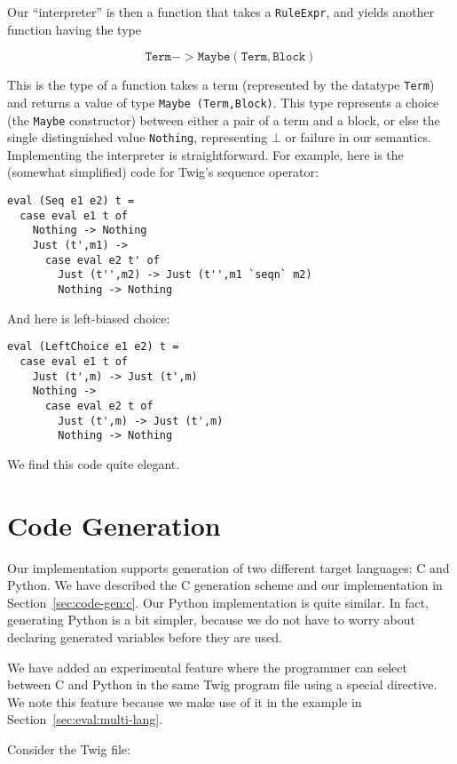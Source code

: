 Our ``interpreter'' is then a function that takes a
\texttt{RuleExpr}, and yields another function having the type

\[
\mathtt{Term -> Maybe(Term,Block)}
\]

This is the type of a function takes a term (represented by the
datatype \texttt{Term}) and returns a value of type \texttt{Maybe
(Term,Block)}. This type represents a choice (the \texttt{Maybe}
constructor) between either a pair of a term and a block, or else
the single distinguished value \texttt{Nothing}, representing
$\bot$ or failure in our semantics. Implementing the interpreter
is straightforward. For example, here is the (somewhat simplified)
code for Twig's sequence operator:

\begin{verbatim}
eval (Seq e1 e2) t =
  case eval e1 t of
    Nothing -> Nothing
    Just (t',m1) -> 
      case eval e2 t' of
        Just (t'',m2) -> Just (t'',m1 `seqn` m2)
        Nothing -> Nothing
\end{verbatim}

And here is left-biased choice:

\begin{verbatim}
eval (LeftChoice e1 e2) t =
  case eval e1 t of
    Just (t',m) -> Just (t',m)
    Nothing -> 
      case eval e2 t of
        Just (t',m) -> Just (t',m)
        Nothing -> Nothing
\end{verbatim}

We find this code quite elegant.

\section{Code Generation}
\label{sec:impl:code-gen}

Our implementation supports generation of two different target
languages: C and Python. We have described the C generation scheme
and our implementation in Section~\ref{sec:code-gen:c}. Our Python
implementation is quite similar. In fact, generating Python is a
bit simpler, because we do not have to worry about declaring
generated variables before they are used.

We have added an experimental feature where the programmer can
select between C and Python in the same Twig program file using a
special directive. We note this feature because we make use of it
in the example in Section~\ref{sec:eval:multi-lang}. 

Consider the Twig file:

